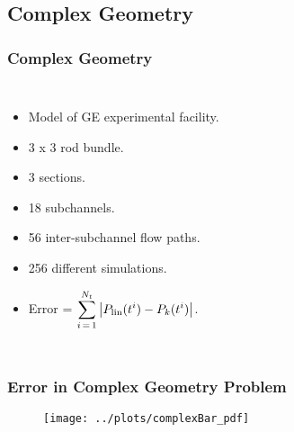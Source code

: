 \documentclass[compress,xcolor=table]{beamer}
\begin{document}
\subsection[Complex Geometry]{Complex Geometry}
\begin{frame}
\frametitle{Complex Geometry}
\begin{columns}

\begin{itemize}
\item{Model of GE experimental facility.}
\item{3 x 3 rod bundle.}
\item{3 sections.}
\item{18 subchannels.}
\item{56 inter-subchannel flow paths.}
\item{256 different simulations.}
\item{Error = $\displaystyle \sum_{i\,=\,1}^{N_{t}} \left|P_{\text{lin}}(t^{i}) -P_{k}(t^{i})\right|$.}
\end{itemize}


\begin{figure}[h!t]
\centering
\resizebox{\textwidth}{!}{

}
\end{figure}

\end{columns}
\end{frame}
\begin{frame}
\frametitle{Error in Complex Geometry Problem}

\begin{figure}[h!t]
\centering
\texttt{[image: ../plots/complexBar\_pdf]}
\end{figure}

\end{frame}
\end{document}
